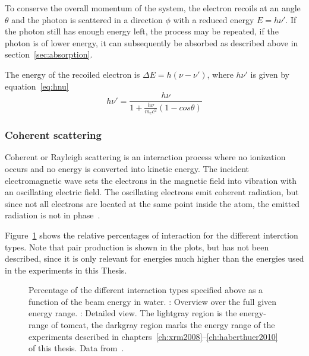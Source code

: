 To conserve the overall momentum of the system, the electron recoils at an angle $\theta$ and the photon is scattered in a direction $\phi$ with a reduced energy $E=h\nu'$. If the photon still has enough energy left, the process may be repeated, if the photon is of lower energy, it can subsequently be absorbed as described above in section~\ref{sec:absorption}.

The energy of the recoiled electron is $\Delta E=h(\nu-\nu')$, where $h\nu'$ is given by equation~\ref{eq:hnu}
\begin{equation}
	h\nu'=\frac{h\nu}{1+\frac{h\nu}{m_{e}c^{2}}(1-cos\theta)}
	\label{eq:hnu}
\end{equation}

\subsubsection{Coherent scattering}
Coherent or Rayleigh scattering is an interaction process where no ionization occurs and no energy is converted into kinetic energy. The incident electromagnetic wave sets the electrons in the magnetic field into vibration with an oscillating electric field. The oscillating electrons emit coherent radiation, but since not all electrons are located at the same point inside the atom, the emitted radiation is not in phase~\cite{Hsieh2003,Stampanoni2002}.

Figure~\ref{fig:InteractionPercentage} shows the relative percentages of interaction for the different interction types. Note that pair production is shown in the plots, but has not been described, since it is only relevant for energies much higher than the energies used in the experiments in this Thesis.

\def\width{0.5\linewidth}%
\def\height{0.309\linewidth}%
\begin{figure}[htb]
	\noindent{}%
	\caption[Interaction types]{Percentage of the different interaction types specified above as a function of the beam energy in water. : Overview over the full given energy range. : Detailed view. The lightgray region is the energy-range of \ac{tomcat}, the darkgray region marks the energy range of the experiments described in chapters~\ref{ch:xrm2008}--\ref{ch:haberthuer2010} of this thesis. Data from~\cite[Table 5-5]{Johns1983}.}%
	\label{fig:InteractionPercentage}%
\end{figure}

